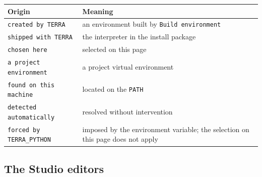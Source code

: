 \documentclass[12pt,a4paper]{article}
\begin{document}
\begin{center}
\label{tab:origin}
\small
\renewcommand{\arraystretch}{1.18}
\begin{tabular}{@{}L{3.6cm}L{12.0cm}@{}}
\toprule
\textbf{Origin} & \textbf{Meaning} \\
\midrule
\texttt{created by TERRA}     & an environment built by \texttt{Build environment} \\
\texttt{shipped with TERRA}   & the interpreter in the install package \\
\texttt{chosen here}          & selected on this page \\
\texttt{a project environment}& a project virtual environment \\
\texttt{found on this machine}& located on the \texttt{PATH} \\
\texttt{detected automatically}& resolved without intervention \\
\texttt{forced by TERRA\_PYTHON} & imposed by the environment variable; the selection on this page does not apply \\
\bottomrule
\end{tabular}
\end{center}

\subsection{The Studio editors}
\end{document}
